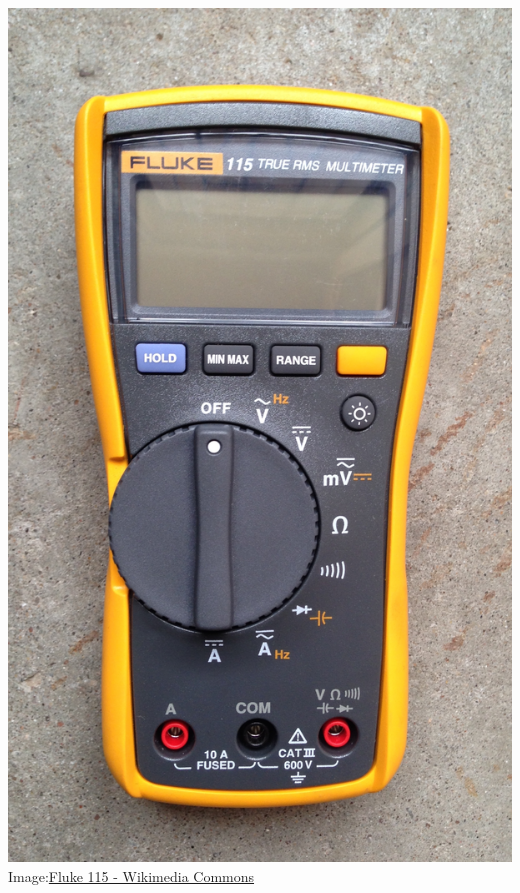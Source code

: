 \documentclass[fleqn]{beamer} %
\begin{document}
\begin{frame}
\begin{multicols}{3}
					\includegraphics[scale=0.04]{images/Fluke_115_multimeter.jpeg}
					\tiny{Image:\href{https://commons.wikimedia.org/wiki/File:Fluke_115_multimeter.jpg}{Fluke 115 - Wikimedia Commons}}	
					

\end{multicols}
\end{frame}
\end{document}
